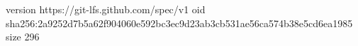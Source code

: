 version https://git-lfs.github.com/spec/v1
oid sha256:2a9252d7b5a62f904060e592bc3ec9d23ab3cb531ae56ca574b38e5cd6ea1985
size 296
